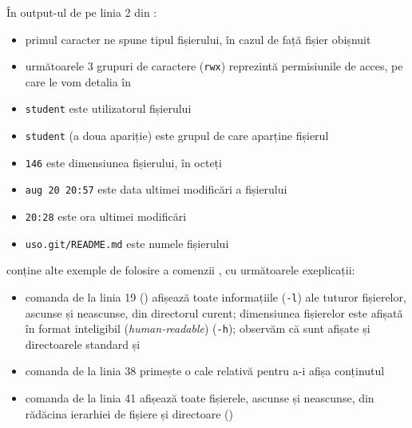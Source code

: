 
În output-ul de pe linia 2 din :

\begin{itemize}
  \item primul caracter ne spune tipul fișierului, în cazul de față fișier obișnuit
  \item următoarele 3 grupuri de caractere (\texttt{rwx}) reprezintă permisiunile de acces, pe care le vom detalia în 
  \item \texttt{student} este utilizatorul fișierului \item \texttt{student} (a doua apariție) este grupul de care aparține fișierul
  \item \texttt{146} este dimensiunea fișierului, în octeți
  \item \texttt{aug 20 20:57} este data ultimei modificări a fișierului
  \item \texttt{20:28} este ora ultimei modificări
  \item \texttt{uso.git/README.md} este numele fișierului
\end{itemize}

 conține alte exemple de folosire a comenzii , cu următoarele exeplicații:

\begin{itemize}
  \item comanda de la linia 19 () afișează toate informațiile (\texttt{-l}) ale tuturor fișierelor, ascunse și neascunse, din directorul curent;
    dimensiunea fișierelor este afișată în format inteligibil (\textit{human-readable}) (\texttt{-h});
    observăm că sunt afișate și directoarele standard  și 
  \item comanda de la linia 38 primește o cale relativă pentru a-i afișa conținutul
  \item comanda de la linia 41 afișează toate fișierele, ascunse și neascunse, din rădăcina ierarhiei de fișiere și directoare (\file{/})
\end{itemize}

